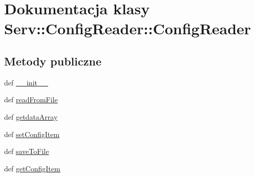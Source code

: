 \hypertarget{class_serv_1_1_config_reader_1_1_config_reader}{
\section{Dokumentacja klasy Serv::ConfigReader::ConfigReader}
\label{class_serv_1_1_config_reader_1_1_config_reader}
}
\subsection*{Metody publiczne}
\begin{DoxyCompactItemize}
\item 
def \hyperlink{class_serv_1_1_config_reader_1_1_config_reader_a79fcc0800606aaab1c5b4b0f2910b821}{\_\-\_\-init\_\-\_\-}
\item 
def \hyperlink{class_serv_1_1_config_reader_1_1_config_reader_ac8ff5305639fac5691feb7de4ae9ceea}{readFromFile}
\item 
def \hyperlink{class_serv_1_1_config_reader_1_1_config_reader_a6a032fedc46e0b5557d1124aeb5fc996}{getdataArray}
\item 
def \hyperlink{class_serv_1_1_config_reader_1_1_config_reader_a44baeb28dc94ccbc797ab1164d98fa04}{setConfigItem}
\item 
def \hyperlink{class_serv_1_1_config_reader_1_1_config_reader_a919cf4af7c9d0eb3a91ef578731edb0a}{saveToFile}
\item 
def \hyperlink{class_serv_1_1_config_reader_1_1_config_reader_a9679117d87cde62fd4243670089a11cc}{getConfigItem}
\end{DoxyCompactItemize}
